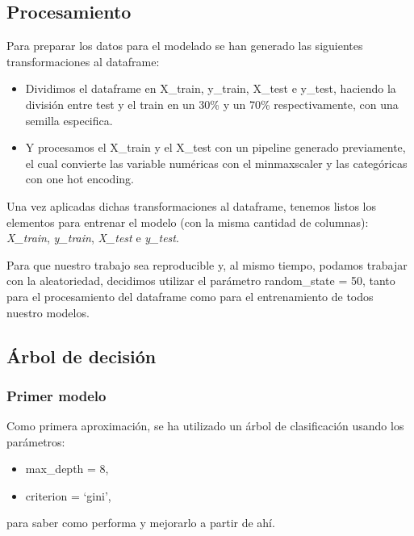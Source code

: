 \documentclass[a4paper]{article}
\begin{document}
    \subsection{Procesamiento}

        Para preparar los datos para el modelado se han generado las siguientes transformaciones al dataframe:
        \begin{itemize}
            \item  Dividimos el dataframe en X\_train, y\_train, X\_test e y\_test, haciendo la división entre test y el train en un 30\% y un 70\% respectivamente, con una semilla especifica.
            \item  Y procesamos el X\_train y el X\_test con un pipeline generado previamente, el cual convierte las variable numéricas con el minmaxscaler y las categóricas con one hot encoding.
        \end{itemize}

        Una vez aplicadas dichas transformaciones al dataframe, tenemos listos los elementos para entrenar el modelo (con la misma cantidad de columnas): \textit{X\_train}, \textit{y\_train}, \textit{X\_test} e \textit{y\_test}.

        Para que nuestro trabajo sea reproducible y, al mismo tiempo, podamos trabajar con la aleatoriedad, decidimos utilizar el parámetro random\_state = 50, tanto para el procesamiento del dataframe como para el entrenamiento de todos nuestro modelos.

    \subsection{Árbol de decisión}

        \subsubsection{Primer modelo}

            Como primera aproximación, se ha utilizado un árbol de clasificación usando los parámetros:
            \begin{itemize}
                \item max\_depth = 8,
                \item criterion = `gini',
            \end{itemize}
            para saber como performa y mejorarlo a partir de ahí.
 
\end{document}
